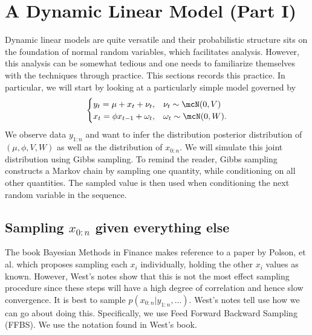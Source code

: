 \documentclass{article}
\begin{document}
\section{A Dynamic Linear Model (Part I)}

Dynamic linear models are quite versatile and their probabilistic structure sits on the foundation of normal random variables, which facilitates analysis.  However, this analysis can be somewhat tedious and one needs to familiarize themselves with the techniques through practice.  This sections records this practice.  In particular, we will start by looking at a particularly simple model governed by
\[
\begin{cases}
y_t = \mu + x_t + \nu_t, & \nu_t \sim \mcN(0, V) \\
x_t = \phi x_{t-1} + \omega_t, & \omega_t \sim \mcN(0, W).
\end{cases}
\]
We observe data $y_{1:n}$ and want to infer the distribution posterior distribution of $(\mu, \phi, V, W)$ as well as the distribution of $x_{0:n}$.  We will simulate this joint distribution using Gibbs sampling.  To remind the reader, Gibbs sampling constructs a Markov chain by sampling one quantity, while conditioning on all other quantities.  The sampled value is then used when conditioning the next random variable in the sequence.

\subsection{Sampling $x_{0:n}$ given everything else}

The book Bayesian Methods in Finance makes reference to a paper by Polson, et al. which proposes sampling each $x_i$ individually, holding the other $x_i$ values as known.  However, West's notes show that this is not the most effect sampling procedure since these steps will have a high degree of correlation and hence slow convergence.  It is best to sample $p(x_{0:n} | y_{1:n}, \ldots)$.  West's notes tell use how we can go about doing this.  Specifically, we use Feed Forward Backward Sampling (FFBS).  We use the notation found in West's book.
\end{document}
